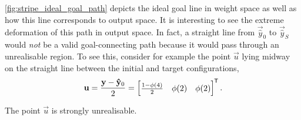 \ref{fig:stripe_ideal_goal_path} depicts the ideal goal line in weight space as well as how this line corresponds to output space.
It is interesting to see the extreme deformation of this path in output space. 
In fact, a straight line from $\vec{\hat{y}}_0$ to $\vec{\hat{y}}_S$ would \textit{not} be a valid goal-connecting path because it would pass through an unrealisable region.
To see this, consider for example the point $\vec{u}$ lying midway on the straight line between the initial and target configurations,
\begin{equation*}
    \mathbf{u}=
    \frac{\mathbf{y}-\mathbf{\hat{y}}_0}{2}=
    \begin{bmatrix}
        \frac{1-\phi(4)}{2} & \phi(2) & \phi(2)
    \end{bmatrix}^{\mkern-1.5mu\mathsf{T}}.
\end{equation*}
\begin{theorem}
    \label{thm:stripe_unrealisable_point}
    The point $\vec{u}$ is strongly unrealisable.
\end{theorem}
